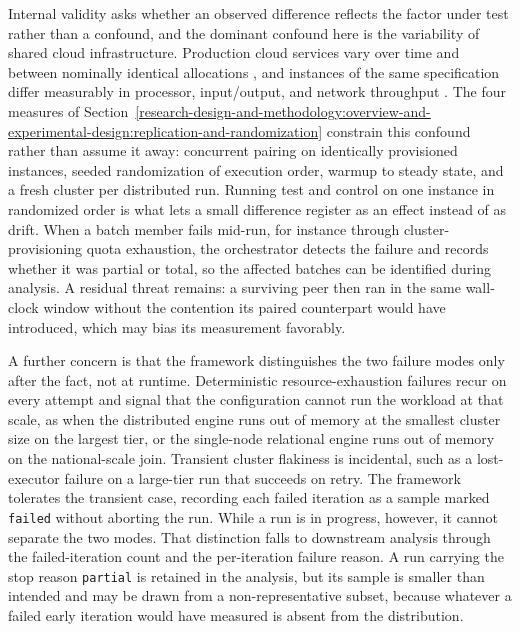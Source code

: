 Internal validity asks whether an observed difference reflects the factor under test rather than a confound, and the dominant confound here is the variability of shared cloud infrastructure. Production cloud services vary over time and between nominally identical allocations \parencite{iosup2011_performance_variability_cloud_services}, and instances of the same specification differ measurably in processor, input/output, and network throughput \parencite{schad2010_runtime_measurements_cloud}. The four measures of Section~\ref{research-design-and-methodology:overview-and-experimental-design:replication-and-randomization} constrain this confound rather than assume it away: concurrent pairing on identically provisioned instances, seeded randomization of execution order, warmup to steady state, and a fresh cluster per distributed run. Running test and control on one instance in randomized order is what lets a small difference register as an effect instead of as drift. When a batch member fails mid-run, for instance through cluster-provisioning quota exhaustion, the orchestrator detects the failure and records whether it was partial or total, so the affected batches can be identified during analysis. A residual threat remains: a surviving peer then ran in the same wall-clock window without the contention its paired counterpart would have introduced, which may bias its measurement favorably.

A further concern is that the framework distinguishes the two failure modes only after the fact, not at runtime. Deterministic resource-exhaustion failures recur on every attempt and signal that the configuration cannot run the workload at that scale, as when the distributed engine runs out of memory at the smallest cluster size on the largest tier, or the single-node relational engine runs out of memory on the national-scale join. Transient cluster flakiness is incidental, such as a lost-executor failure on a large-tier run that succeeds on retry. The framework tolerates the transient case, recording each failed iteration as a sample marked \texttt{failed} without aborting the run. While a run is in progress, however, it cannot separate the two modes. That distinction falls to downstream analysis through the failed-iteration count and the per-iteration failure reason. A run carrying the stop reason \texttt{partial} is retained in the analysis, but its sample is smaller than intended and may be drawn from a non-representative subset, because whatever a failed early iteration would have measured is absent from the distribution.

